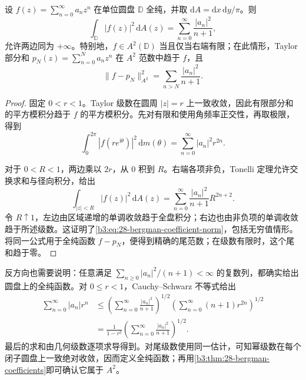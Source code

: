 \begin{theorem}\label{b3:thm:28-bergman-coefficients}
设 \(f(z)=\sum_{n=0}^{\infty}a_nz^n\) 在单位圆盘 \(\mathbb D\) 全纯，并取 \(\mathrm{d}A=\mathrm{d}x\,\mathrm{d}y/\pi\)。则
\begin{equation}\label{b3:eq:28-bergman-coefficient-norm}
 \int_{\mathbb D}|f(z)|^2\,\mathrm{d}A(z)
 =\sum_{n=0}^{\infty}\frac{|a_n|^2}{n+1},
\end{equation}
允许两边同为 \(+\infty\)。特别地，\(f\in A^2(\mathbb D)\) 当且仅当右端有限；在此情形，Taylor 部分和 \(p_N(z)=\sum_{n=0}^Na_nz^n\) 在 \(A^2\) 范数中趋于 \(f\)，且
\[
 \|f-p_N\|_{A^2}^2=\sum_{n>N}\frac{|a_n|^2}{n+1}.
\]
\end{theorem}
\begin{proof}
固定 \(0<r<1\)。Taylor 级数在圆周 \(|z|=r\) 上一致收敛，因此有限部分和的平方模积分趋于 \(f\) 的平方模积分。先对有限和使用角频率正交性，再取极限，得到
\[
 \int_0^{2\pi}|f(re^{\mathrm{i}\theta})|^2\,\mathrm{d}m(\theta)
 =\sum_{n=0}^{\infty}|a_n|^2r^{2n}.
\]


对于 \(0<R<1\)，两边乘以 \(2r\)，从 \(0\) 积到 \(R\)。右端各项非负，Tonelli 定理允许交换求和与径向积分，给出
\[
 \int_{|z|<R}|f(z)|^2\,\mathrm{d}A(z)
 =\sum_{n=0}^{\infty}\frac{|a_n|^2}{n+1}R^{2n+2}.
\]
令 \(R\uparrow1\)，左边由区域递增的单调收敛趋于全盘积分；右边也由非负项的单调收敛趋于所述级数。这证明了\eqref{b3:eq:28-bergman-coefficient-norm}，包括无穷值情形。将同一公式用于全纯函数 \(f-p_N\)，便得到精确的尾范数；在级数有限时，这个尾和趋于零。
\end{proof}

反方向也需要说明：任意满足 \(\sum_{n\ge0}|a_n|^2/(n+1)<\infty\) 的复数列，都确实给出圆盘上的全纯函数。对 \(0\le r<1\)，Cauchy--Schwarz 不等式给出
\begin{equation}\label{b3:eq:28-weighted-series-control}
 \begin{aligned}
 \sum_{n=0}^{\infty}|a_n|r^n
 &\le\left(\sum_{n=0}^{\infty}\frac{|a_n|^2}{n+1}\right)^{1/2}
 \left(\sum_{n=0}^{\infty}(n+1)r^{2n}\right)^{1/2}
 \\
 &=\frac1{1-r^2}
 \left(\sum_{n=0}^{\infty}\frac{|a_n|^2}{n+1}\right)^{1/2}.
 \end{aligned}
\end{equation}
最后的求和由几何级数逐项求导得到。对尾级数使用同一估计，可知幂级数在每个闭子圆盘上一致绝对收敛，因而定义全纯函数；再用\cref{b3:thm:28-bergman-coefficients}即可确认它属于 \(A^2\)。

